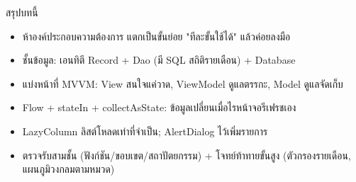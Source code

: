 \begin{tcbsummary}{สรุปบทนี้}
\begin{itemize}
  \item ห้าองค์ประกอบความต้องการ แตกเป็นขั้นย่อย "ทีละขั้นใช้ได้" แล้วค่อยลงมือ
  \item ชั้นข้อมูล: เอนทิตี Record + Dao (มี SQL สถิติรายเดือน) + Database
  \item แบ่งหน้าที่ MVVM: View สนใจแค่วาด, ViewModel ดูแลตรรกะ, Model ดูแลจัดเก็บ
  \item Flow + stateIn + collectAsState: ข้อมูลเปลี่ยนเมื่อไรหน้าจอรีเฟรชเอง
  \item LazyColumn ลิสต์โหลดเท่าที่จำเป็น; AlertDialog ไว้เพิ่มรายการ
  \item ตรวจรับสามชั้น (ฟังก์ชัน/ขอบเขต/สถาปัตยกรรม) + โจทย์ท้าทายขั้นสูง (ตัวกรองรายเดือน, แผนภูมิวงกลมตามหมวด)
\end{itemize}

\end{tcbsummary}
